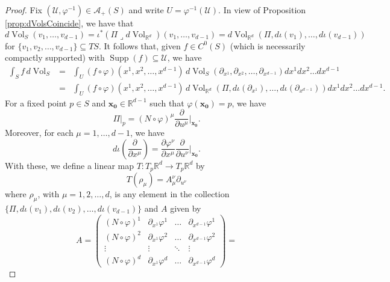 \documentclass{article}
\newcommand\supp{\operatorname{Supp}}
\newcommand{\p}{\partial}
\newcommand{\R}{\mathbb{R}}
\newcommand{\f}[2]{\frac{#1}{#2}}
\newcommand{\lp}{\left(}
\newcommand{\rp}{\right)}
\newcommand{\iprod}{\mathbin{\lrcorner}}
\theoremstyle{theorem}
\newcommand{\Vol}{\operatorname{Vol}}
\begin{document}
\begin{proof}
Fix $(\mathcal{U}, \varphi^{-1})\in\mathcal{A}_+(S)$ and write $U=\varphi^{-1}(\mathcal{U})$. In view of Proposition \ref{prop:dVolsCoincide}, we have that
\begin{equation*}
    d\Vol_S(v_1,\dots, v_{d-1}) = \iota^*(\Pi \iprod d\Vol_{\R^d})(v_1,\dots, v_{d-1}) = d\Vol_{\R^d}(\Pi, d\iota(v_1),\dots, d\iota(v_{d-1}))
\end{equation*}
for $\{v_1,v_2,\dots,v_{d-1}\} \subseteq TS$. It follows that, given $f\in C^0(S)$ (which is necessarily compactly supported) with $\supp(f)\subseteq \mathcal{U}$, we have
\begin{eqnarray*}\label{eq:dVolS}
\int_S f\,d\Vol_S&=&\int_U(f\circ\varphi)(x^1,x^2,\dots,x^{d-1})\,d\Vol_S(\partial_{x^1},\partial_{x^2},\dots,\partial_{x^{d-1}})dx^1dx^2\dots dx^{d-1}\\
&=& \int_U(f\circ\varphi)(x^1,x^2,\dots,x^{d-1})\,d\Vol_{\R^d}(\Pi, d\iota(\p_{x^1}),  \dots, d\iota(\p_{x^{d-1}}) )dx^1dx^2\dots dx^{d-1}.
\end{eqnarray*}
For a fixed point $p\in S$ and $\mathbf{x_0}\in \R^{d-1}$ such that $\varphi(\mathbf{x_0}) = p$, we have
\begin{equation*}
    \Pi\bigg\vert_p = (N\circ\varphi)^\mu \f{\p}{\p u^\mu}\bigg\vert_{\mathbf{x_0}}.
\end{equation*}
Moreover, for each $\mu = 1,\dots, d-1$, we have
\begin{equation*}
    d\iota\lp \f{\p}{\p x^\mu} \rp = \f{\p \varphi^\nu}{\p x^\mu} \f{\p}{\p u^\nu}\bigg\vert_{\mathbf{x_0}}.
\end{equation*}
With these, we define a linear map $T: T_p \R^d \to T_p \R^d$ by 
\begin{equation*}
    T(\rho_\mu) = A_\mu^\nu \p_{u^\nu}
\end{equation*}
where $\rho_\mu$, with $\mu = 1,2,\dots,d$, is any element in the collection $\{ \Pi, d\iota(v_1), d\iota(v_2),\dots, d\iota(v_{d-1}) \}$ and $A$ given by 
\begin{equation*}
    A = \begin{pmatrix}
    (N\circ\varphi)^1&\p_{x^1}\varphi^1&\dots&\p_{x^{d-1}} \varphi^{1}\\
    (N\circ\varphi)^2&\p_{x^1}\varphi^2&\dots&\p_{x^{d-1}} \varphi^{2}\\
    \vdots&\vdots&\ddots& \vdots \\
    (N\circ\varphi)^d&\p_{x^1}\varphi^d&\dots&\p_{x^{d-1}} \varphi^{d}
    \end{pmatrix} =

\end{equation*}
\end{proof}
\end{document}
